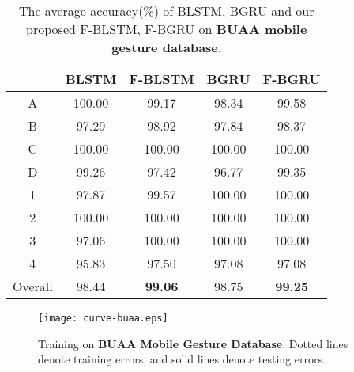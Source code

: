 \documentclass[review]{elsarticle}
\begin{document}
\begin{table*}
	\centering
	\caption{The average accuracy(\%) of BLSTM, BGRU and our proposed F-BLSTM, F-BGRU on \textbf{BUAA mobile gesture database}.}
	\label{table:buaadatabase}
	\vspace*{6pt}
	\begin{tabular}{||c||c|c||c|c||}
		\hline
		\diagbox{\textbf{Gesture}}{\textbf{Method}} & BLSTM & F-BLSTM & BGRU & F-BGRU\\
		\hline
		A & 100.00 & 99.17  & 98.34  & 99.58 \\ B & 97.29  & 98.92 & 97.84  & 98.37 \\ C & 100.00 & 100.00 & 100.00 & 100.00 \\ D & 99.26  & 97.42  & 96.77  & 99.35 \\ 1 & 97.87  & 99.57  & 100.00 & 100.00 \\ 2 & 100.00 & 100.00 & 100.00 & 100.00 \\ 3 & 97.06  & 100.00 & 100.00 & 100.00 \\ 4 & 95.83  & 97.50  & 97.08  & 97.08 \\ \hline
		Overall & 98.44 & \textbf{99.06} & 98.75 & \textbf{99.25} \\ \hline
	\end{tabular}
\end{table*}

\begin{figure*}[htbp]
	\normalsize
	\centering
	\texttt{[image: curve-buaa.eps]}
	\caption{Training on \textbf{BUAA Mobile Gesture Database}. Dotted lines denote training errors, and solid lines denote testing errors. }
	\label{fig:curve-buaa}
	\vspace*{4pt}
\end{figure*}
\end{document}
